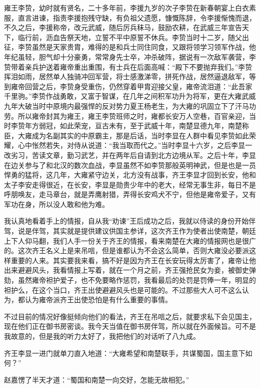 雍王李贽，幼时就有贤名，二十多年前，李援九岁的次子李贽在新春朝宴上白衣素服，直言进谏，指责李援抱残守缺，有负祖父遗愿，慷慨陈辞，令李援惭愧而退，不久之后，李援称帝，改元武威，随后厉兵秣马，鼓励农耕，在武威三年宣告天下，临行前，沥血告祭天地，立誓不平中原誓不休兵。李贽当时十二岁，随父出征，李贽虽然是天家贵胄，难得的是和兵士同住同食，又跟将领学习领军作战，他年纪虽轻，胆气却十分豪勇，常常身先士卒，冲杀破阵，据说有一次敌军袭营，李贽带着亲兵护送着雍帝重出重围，有士兵在后面高喊：“殿下不要抛弃我们。”李贽挥泪如雨，居然单人独骑冲回军营，将士感激涕零，拼死作战，居然逼退敌军，等到雍帝回营之后，李贽身受重伤，仍然穿着甲胄迎接父皇，雍帝流泪道：“此吾家千里驹。”李贽作战勇敢，又富于智谋，在几年之间积军功升为将军，更在大雍武威九年大破当时中原境内最强悍的反对势力夏王杨老生，为大雍的巩固立下了汗马功劳。所以雍帝封其为雍王，雍王李贽班师之时，雍都长安万人空巷，百官亲迎，当时李贽年方弱冠，如此荣宠，亘古未有，至于武威十年，南楚显德九年，南楚称臣，大雍成为名副其实的中原霸主，那是后话，当时李显在人群中看见李贽如此荣耀，心中怅然若失，对侍从说道：“我当取而代之。”当时李显十六岁，之后李显一改劣习，苦读文章，勤习武艺，并在两年后自请到北方边境从军。之后十年，李显在边关参与了和北汉的数次血战，李显虽然不如李贽那般英明神武，但是也是一员悍勇的猛将，这几年，大雍紧守边关，北方没有战事，齐王李显才回到长安，他和太子李安走得很近，在长安，李显是勋贵少年中的老大，经常无事生非，每日不是呼朋唤友，走马章台，就是弄鹰射猎，弄得长安鸡犬不宁，但他是雍帝爱子，又有军功在身，所以没人敢和他为难。

我认真地看着手上的情报，自从我“劝谏”王后成功之后，我就以侍读的身份开始伴驾，说是伴驾，其实就是提供建议供国主参详，这次齐王作为使者出使南楚，朝廷上下人仰马翻，我们人手一份关于齐王的情报，看来南楚在大雍的情报网也是很广的。这次齐王名义上是来吊唁，但是谁都认为不会这么简单，否则大雍没必要派这样重要的人来。其实要我来看，搞不好是因为齐王在长安玩得太厉害了，雍帝让他出来避避风头，我看情报上写着，就在一个月之前，齐王强抢民女为妾，被御史弹劾，虽然雍帝袒护爱子，也不免要略作惩罚，我看最后的处罚是罚俸一年，明显的袒护么，在这个当口，齐王出使避避风头也是可能的。不过那些大人可不这么认为，都认为雍帝派齐王出使恐怕是有什么重要的事情。

不过目前的情况好像挺倾向他们的看法，齐王在吊唁之后，就要求私下会见国主，现在他们正在御书房密谈。我今天当值在御书房伴驾，所以就在外面候旨。可不是我故意的，但是我的听力太好了，我把他们的对话听了八九成。

齐王李显一进门就单刀直入地道：“大雍希望和南楚联手，共谋蜀国，国主意下如何？”

赵嘉愣了半天才道：“蜀国和南楚一向交好，怎能无故相犯。”

